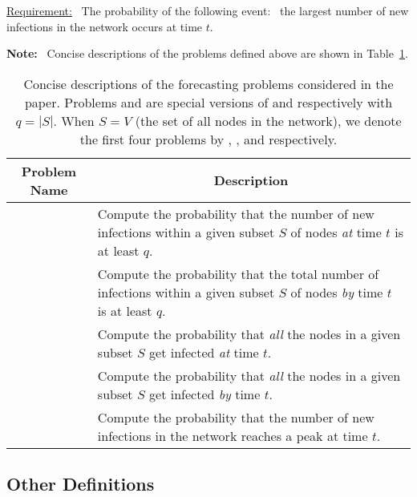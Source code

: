 \smallskip
\noindent
\underline{Requirement:}~ The probability of the following event:~
the largest number of new infections in the network occurs at time $t$.

\medskip

\noindent
\textbf{Note:}~
Concise descriptions of
the problems defined above are shown in Table~\ref{tab:prob_def}.

\medskip
\begin{table}[tbh]
\begin{center}
\begin{tabular}{|p{1.6in}|p{3.9in}|} \hline
\multicolumn{1}{|c|}{\textbf{Problem Name}} & 
\multicolumn{1}{|c|}{\textbf{Description}} \\ \hline\hline   
\tNewInfs{} & {Compute the probability that the number of new infections 
              within a given subset $S$ of nodes \emph{at} time $t$ 
           is at least $q$.} \\ \hline
\tTotInfs{} & {Compute the probability that the total number of 
              infections within a given subset $S$ of nodes \emph{by} time $t$ is 
              at least $q$.} \\ \hline
\tVuls{} & {Compute the probability that \emph{all} the nodes 
                         in a given subset $S$ get infected 
                         \emph{at} time $t$.} \\ \hline
\tTotVuls{}   & {Compute the probability that \emph{all} the nodes 
                             in a given subset $S$ get infected 
                             \emph{by} time $t$.} \\ \hline
\tPeak{}   & {Compute the probability that the number of new infections in the
              network reaches a peak at time $t$.} \\ \hline\hline
\end{tabular}
\end{center}
\caption{Concise descriptions of the forecasting 
problems considered in the paper.
Problems \tVuls{} and \tTotVuls{} are special versions 
of \tNewInfs{} and \tTotInfs{} respectively with $q = |S|$.
When $S = V$ (the set of all nodes in the network), we denote
the first four problems by \tNewInfv, \tTotInfv, \tVulv{} and \tTotVulv{}
respectively.
}
\label{tab:prob_def}
\end{table}

\subsection{Other Definitions} 
\label{sse:other_def}

